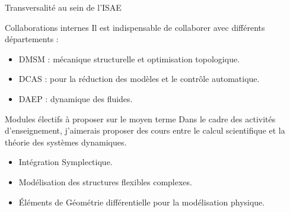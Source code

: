 \documentclass[aspectratio=169, french]{ISAE-Beamer}
\begin{document}
\begin{frame}{Transversalité au sein de l'ISAE}


	\begin{block}{Collaborations internes}
		Il est indispensable de collaborer avec différents départements :
		\begin{itemize}
			\item DMSM : mécanique structurelle et optimisation topologique. 
			\item DCAS : pour la réduction des modèles et le contrôle automatique.
			\item DAEP : dynamique des fluides.
		\end{itemize}
	\end{block}

\end{frame}


\begin{frame}{Modules électifs à proposer sur le moyen terme}
Dans le cadre des activités d'enseignement, j'aimerais proposer des cours entre le calcul scientifique et la théorie des systèmes dynamiques.
\begin{itemize}
	\item Intégration Symplectique.
	\item Modélisation des structures flexibles complexes.
	\item Éléments de Géométrie différentielle pour la modélisation physique.
\end{itemize}
\end{frame}
	





	
	

\end{document}
